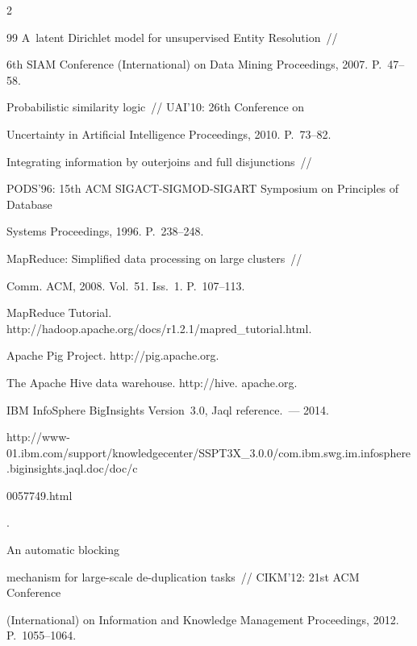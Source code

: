 \begin{multicols}{2}
{{\begin{thebibliography}{99}
 A~latent Dirichlet model for unsupervised Entity Resolution~//

6th SIAM Conference (International) on Data Mining Proceedings, 2007. P.~47--58.


 Probabilistic similarity logic~// UAI'10:  26th Conference on

Uncertainty in Artificial Intelligence Proceedings, 2010. P.~73--82.


 Integrating information by outerjoins and full disjunctions~//

PODS'96: 15th ACM SIGACT-SIGMOD-SIGART Symposium on Principles of Database

Systems Proceedings, 1996. P.~238--248.


 MapReduce: Simplified data processing on large clusters~//

Comm. ACM, 2008. Vol.~51. Iss.~1. P.~107--113.


MapReduce Tutorial. {\sf http://hadoop.apache.org/docs/\linebreak r1.2.1/mapred\_tutorial.html}.


Apache Pig Project. {\sf http://pig.apache.org}.


The Apache Hive data warehouse. {\sf http://hive. apache.org}.


IBM InfoSphere BigInsights Version~3.0, Jaql reference.~--- 2014.

{\sf

http://www-01.ibm.com/support/\linebreak knowledgecenter/SSPT3X\_3.0.0/com.ibm.swg.im.\linebreak infosphere.biginsights.jaql.doc/doc/c

0057749.html}.


 An automatic blocking

mechanism for large-scale de-duplication tasks~// CIKM'12:  21st ACM Conference

(International) on Information and Knowledge Management Proceedings, 2012. P.~1055--1064.


\end{thebibliography}}}
\end{multicols}
